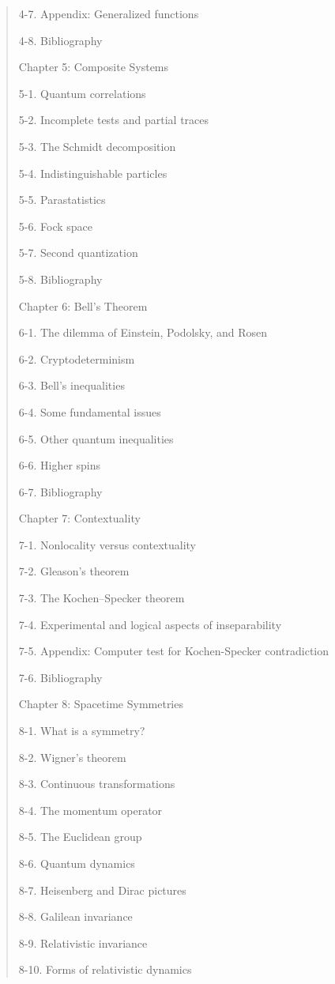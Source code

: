 \documentclass[12pt]{article}
\begin{document}
\begin{quote}
{4-7. Appendix: Generalized functions 

4-8. Bibliography 

Chapter 5: Composite Systems

5-1. Quantum correlations 

5-2. Incomplete tests and partial traces 

5-3. The Schmidt decomposition 

5-4. Indistinguishable particles 

5-5. Parastatistics 

5-6. Fock space 

5-7. Second quantization 

5-8. Bibliography 

Chapter 6: Bell's Theorem

6-1. The dilemma of Einstein, Podolsky, and Rosen 

6-2. Cryptodeterminism 

6-3. Bell's inequalities 

6-4. Some fundamental issues 

6-5. Other quantum inequalities 

6-6. Higher spins 

6-7. Bibliography 

Chapter 7: Contextuality

7-1. Nonlocality versus contextuality 

7-2. Gleason's theorem 

7-3. The Kochen--Specker theorem 

7-4. Experimental and logical aspects of inseparability 

7-5. Appendix: Computer test for Kochen-Specker contradiction 

7-6. Bibliography 

Chapter 8: Spacetime Symmetries

8-1. What is a symmetry? 

8-2. Wigner's theorem 

8-3. Continuous transformations 

8-4. The momentum operator 

8-5. The Euclidean group 

8-6. Quantum dynamics 

8-7. Heisenberg and Dirac pictures 

8-8. Galilean invariance 

8-9. Relativistic invariance 

8-10. Forms of relativistic dynamics 

}
\end{quote}
\end{document}
